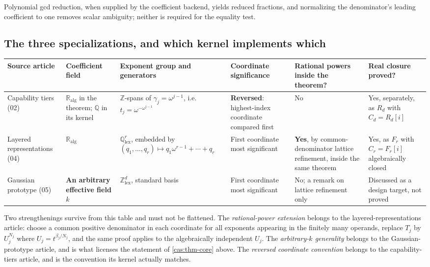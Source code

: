\documentclass[11pt,letterpaper]{article}
\numberwithin{equation}{section}
\theoremstyle{definition}
\theoremstyle{remark}
\newcommand{\Q}{\mathbb Q}
\newcommand{\Z}{\mathbb Z}
\newcommand{\RA}{\mathbb R_{\mathrm{alg}}}
\begin{document}
Polynomial gcd reduction, when supplied by the coefficient backend, yields
reduced fractions, and normalizing the denominator's leading coefficient to one
removes scalar ambiguity; neither is required for the equality test.

\subsection{The three specializations, and which kernel implements which}
\label{cas:sub-threecores}
\begingroup\small
\begin{longtable}{@{}P{0.155\textwidth}P{0.15\textwidth}P{0.175\textwidth}P{0.15\textwidth}P{0.115\textwidth}P{0.115\textwidth}@{}}
\toprule
Source article & Coefficient field & Exponent group and generators &
Coordinate significance & Rational powers inside the theorem? & Real closure
proved?\\
\midrule\endhead
Capability tiers (02) & $\RA$ in the theorem; $\Q$ in its kernel &
$\Z$-spans of $\gamma_j=\omega^{j-1}$, i.e.\ $t_j=\omega^{-\omega^{j-1}}$ &
\textbf{Reversed}: highest-index coordinate compared first & No &
Yes, separately, as $R_d$ with $C_d=R_d[i]$\\[0.5em]
Layered representations (04) & $\RA$ & $\Q^r_{\mathrm{lex}}$, embedded by
$(q_1,\dots,q_r)\mapsto q_1\omega^{r-1}+\cdots+q_r$ & First coordinate most
significant & \textbf{Yes}, by common-denominator lattice refinement, inside the
same theorem & Yes, as $F_r$ with $C_r=F_r[i]$ algebraically closed\\[0.5em]
Gaussian prototype (05) & \textbf{An arbitrary effective field} $k$ &
$\Z^d_{\mathrm{lex}}$, standard basis & First coordinate most significant &
No; a remark on lattice refinement only & Discussed as a design target, not
proved\\
\bottomrule
\end{longtable}
\endgroup

Two strengthenings survive from this table and must not be flattened. The
\emph{rational-power extension} belongs to the layered-representations article:
choose a common positive denominator in each coordinate for all exponents
appearing in the finitely many operands, replace $T_j$ by $U_j^{N_j}$ where
$U_j=t^{\beta_j/N_j}$, and the same proof applies to the algebraically
independent $U_j$. The \emph{arbitrary-$k$ generality} belongs to the
Gaussian-prototype article, and is what licenses the statement of
\cref{cas:thm-core} above. The \emph{reversed coordinate convention} belongs to
the capability-tiers article, and is the convention its kernel actually matches.
\end{document}
